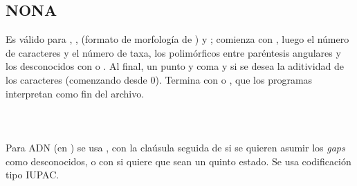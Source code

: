 \subsection{NONA}
\noindent
Es v\'alido para , ,  (formato de morfolog\'ia de ) y ; comienza con , luego el n\'umero de caracteres y el n\'umero de taxa, los polim\'orficos entre par\'entesis angulares y los desconocidos con \cmd{-} o . Al final, un punto y coma y si se desea la aditividad de los caracteres (comenzando desde 0). Termina con  o , que los programas interpretan como fin del archivo.\\
\\
\noindent
{}\\
\\
Para ADN (en ) se usa , con la cla\'usula  seguida de  si se quieren asumir los \textit{gaps} como desconocidos, o con \cmd{;} si quiere que sean un quinto estado. Se usa codificaci\'on tipo IUPAC.\\
\\
